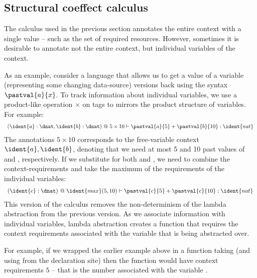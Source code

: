 
\subsection{Structural coeffect calculus}

The calculus used in the previous section annotates the entire context with a single value --  such
as the set of required resources. However, sometimes it is desirable to annotate not the entire 
context, but individual variables of the context.

As an example, consider a language that allows us to get a value of a variable (representing
some changing data-source)  versions back using the syntax $\pastval{a}{x}$. 
To track information about individual variables, we use a product-like operation $\times$ on tags 
to mirrors the product structure of variables. For example:
%
\begin{equation*}
\begin{array}{l}
(\ident{a}:\dnat, \ident{b}:\dnat) ~@~ 5 \times 10
  \vdash
    \pastval{a}{5}+\pastval{b}{10}: \ident{nat}
\end{array}
\end{equation*}
%
The annotations $5 \times 10$ corresponds to the free-variable context $\ident{a}, \ident{b}$, denoting
that we need at most 5 and 10 past values of  and , respectively. If we substitute 
 for both  and , we need to combine the context-requirements and take the
maximum of the requirements of the individual variables:
%
\begin{equation*}
\begin{array}{l}
(\ident{c}:\dnat) ~@~ \ident{max}(5, 10)
  \vdash
    \pastval{c}{5}+\pastval{c}{10}: \ident{nat}
\end{array}
\end{equation*}
%
This version of the calculus removes the non-determinism of the lambda abstraction from the previous
version. As we associate information with individual variables, lambda abstraction creates a function
that requires the context requirements associated with the variable that is being abstracted over.

For example, if we wrapped the earlier example above in a function taking  (and using 
 from the declaration site) then the function would have context requirements $5$ -- that
is the number associated with the variable .

